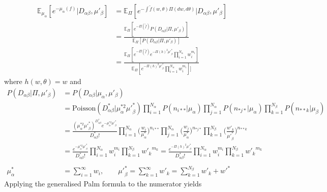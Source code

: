 \documentclass{article}
\begin{document}
\begin{align}
\label{eqn:lpl_d}
\mathbb{E}_{\mu_\alpha}[e^{-\mu_\alpha(f)}|D_{\alpha\beta}, \mu'_\beta] 
&= \mathbb{E}_{\Pi}[e^{-\int \tilde{f}(w, \theta)\Pi(dw, d\theta)}|D_{\alpha\beta}, \mu'_\beta] \\
&= \frac{\mathbb{E}_{\Pi}[ e^{-\Pi(\tilde{f})} P(D_{\alpha\beta}|\Pi, \mu'_\beta)]}{\mathbb{E}_{\Pi}[P(D_{\alpha\beta}|\Pi, \mu'_\beta)]}\\
&= \frac{\mathbb{E}_{\Pi}[e^{-\Pi(\tilde{f})} e^{-\Pi(h)^2{\mu'}_\beta^{*}} \prod_{i=1}^{N_\alpha} w_i^{m_i}]}{\mathbb{E}_{\Pi}[e^{-\Pi(h)^2{\mu'}_\beta^{*}} \prod_{i=1}^{N_\alpha} w_i^{m_i}]]}
\end{align}
where $h(w, \theta) = w$ and
\begin{align}
P(D_{\alpha\beta}|\Pi, \mu'_\beta) & = P(D_{\alpha\beta}|\mu_\alpha, \mu'_\beta)\\
& = \text{Poisson}(D^*_{\alpha\beta}|\mu_\alpha^{*2}{\mu'}_\beta^{*}) 
\prod_{i=1}^{N_\alpha} P(n_{i**}|\mu_\alpha) \prod_{j=1}^{N_\alpha} P(n_{*j*}|\mu_\alpha)
\prod_{k=1}^{N_\beta} P(n_{**k}|\mu_\beta) \\
& = \frac{ (\mu_\alpha^{*2}{\mu'}_\beta^{*})^{D^*_{\alpha\beta}} e^{-\mu_\alpha^{*2}{\mu'}_\beta^{*}} }{D^*_{\alpha\beta}!}
\prod_{i=1}^{N_\alpha} \Big( \frac{w_i}{\mu_\alpha^*} \Big)^{n_{i**}} 
\prod_{j=1}^{N_\alpha} \Big( \frac{w_j}{\mu_\alpha^*} \Big)^{n_{*j*}} 
\prod_{k=1}^{N_\beta} \Big( \frac{w'_k}{{\mu'}_\beta^{*}} \Big)^{n_{**k}}\\
& =\frac{e^{-\mu_\alpha^{*2}{\mu'}_\beta^{*}} }{D^*_{\alpha\beta}!}
\prod_{i=1}^{N_\alpha} w_i^{m_i}
\prod_{k=1}^{N_\beta} {w'_k}^{m_k} 
 =\frac{e^{-\Pi(h)^2{\mu'}_\beta^{*}} }{D^*_{\alpha\beta}!}
\prod_{i=1}^{N_\alpha} w_i^{m_i}
\prod_{k=1}^{N_\beta} {w'_k}^{m_k}\\
\\
\mu_\alpha^* & = \sum_{i=1}^{\infty} w_i, \qquad {\mu'}_\beta^{*} = \sum_{k=1}^{\infty} w'_k = \sum_{k=1}^{N_\beta} w'_k + {w'}^*
\end{align}
Applying the generalised Palm formula to the numerator yields
\end{document}
